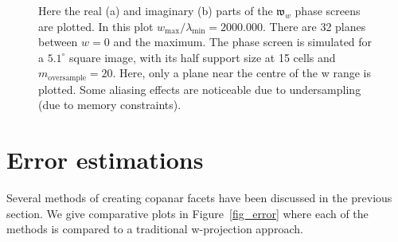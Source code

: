 \begin{figure}[h]
\begin{mdframed}
\begin{subfigure}[b]{0.33\textwidth}
      \caption{}
    \end{subfigure}
    \caption[Sample w phase screens]{Here the real (a) and imaginary (b) parts of the $\mathfrak{w}_w$ phase screens are plotted. 
	    In this plot $w_{\text{max}}/\lambda_{\text{min}} = 2000.000$. There are 32 planes between $w=0$ and the maximum.
	    The phase screen is simulated for a $5.1^\circ$ square image, with its half support size at 15 cells and $m_{\text{oversample}}=20$.
	    Here, only a plane near the centre of the w range is plotted. Some aliasing effects are noticeable due to undersampling (due to memory
	    constraints).}
    \label{fig_phase_screen}
  \end{mdframed}
\end{figure}
\section{Error estimations}
Several methods of creating copanar facets have been discussed in the previous section. We give comparative plots in Figure~\ref{fig_error} where each of the methods is compared to
a traditional w-projection approach.
